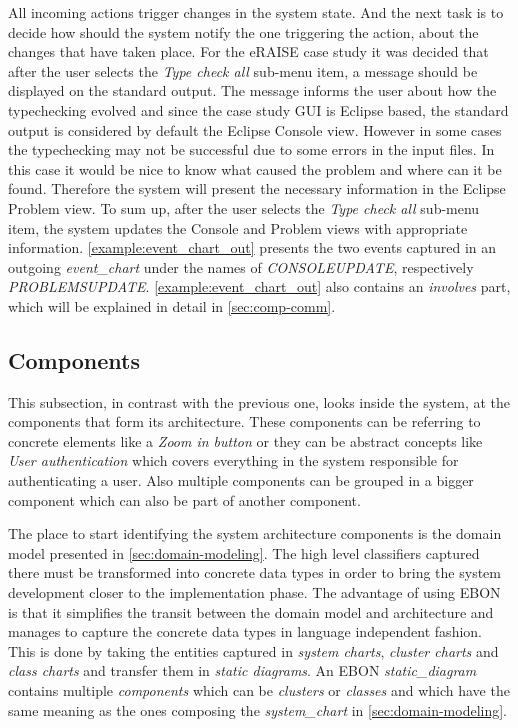 \documentclass[conference]{IEEEtran}
\begin{document}



All incoming actions trigger changes in the system state. And the next
task is to decide how should the system notify the one triggering the
action, about the changes that have taken place. For the eRAISE case
study it was decided that after the user selects the \emph{Type check
all} sub-menu item, a message should be displayed on the standard
output. The message informs the user about how the typechecking
evolved and since the case study GUI is Eclipse based, the standard
output is considered by default the Eclipse Console view. However in
some cases the typechecking may not be successful due to some errors
in the input files. In this case it would be nice to know what caused
the problem and where can it be found. Therefore the system will
present the necessary information in the Eclipse Problem view. To sum
up, after the user selects the \emph{Type check all} sub-menu item,
the system updates the Console and Problem views with appropriate
information. \autoref{example:event_chart_out} presents the two events
captured in an outgoing \emph{event\_chart} under the names of
\emph{CONSOLEUPDATE}, respectively \emph{PROBLEMSUPDATE}.
\autoref{example:event_chart_out} also contains an \emph{involves}
part, which will be explained in detail in \autoref{sec:comp-comm}.


%
\subsection{Components}
\label{sec:components}

This subsection, in contrast with the previous one, looks inside the
system, at the components that form its architecture. These components
can be referring to concrete elements like a \emph{Zoom in button} or
they can be abstract concepts like \emph{User authentication} which
covers everything in the system responsible for authenticating a user.
Also multiple components can be grouped in a bigger component which
can also be part of another component.

The place to start identifying the system architecture components is
the domain model presented in \autoref{sec:domain-modeling}. The high
level classifiers captured there must be transformed into concrete
data types in order to bring the system development closer to the
implementation phase. The advantage of using EBON is that it
simplifies the transit between the domain model and architecture
and manages to capture the concrete data types in language
independent fashion. This is done by taking the entities captured in
\emph{system charts}, \emph{cluster charts} and \emph{class charts} and
transfer them in \emph{static diagrams}. An EBON \emph{static\_diagram}
contains multiple \emph{components} which can be \emph{clusters} or
\emph{classes} and which have the same meaning as the ones composing the
\emph{system\_chart} in \autoref{sec:domain-modeling}.
\end{document}
